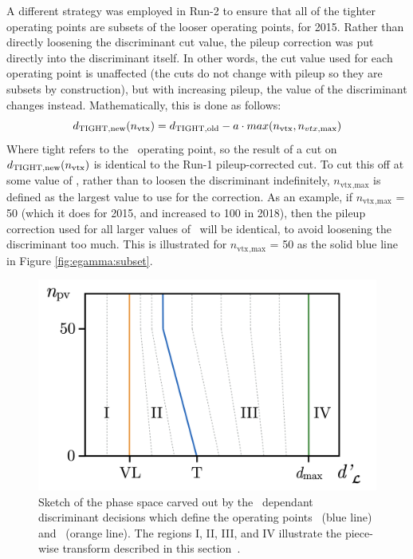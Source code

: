 A different strategy was employed in Run-2 to ensure that all of the tighter operating points are subsets of the looser operating points, for 2015.
Rather than directly loosening the discriminant cut value, the pileup correction was put directly into the discriminant itself.
In other words, the cut value used for each operating point is unaffected (the cuts do not change with pileup so they are subsets by construction), but with increasing pileup, the value of the discriminant changes instead. 
Mathematically, this is done as follows:
\begin{equation}
    d_{\mathrm{{\scriptsize T}\tiny{IGHT},new}}(n_{\mathrm{vtx}}) = d_{\mathrm{{\scriptsize T}\tiny{IGHT},old}} - a \cdot max(n_{\mathrm{vtx}}, n_{vtx,\text{max}})
\end{equation}
Where tight refers to the \Tight\ operating point, so the result of a cut on $d_{\mathrm{{\scriptsize T}IGHT,new}}(n_{\mathrm{vtx}})$ is identical to the Run-1 pileup-corrected cut.
To cut this off at some value of \nvtx, rather than to loosen the discriminant indefinitely, $n_{\mathrm{vtx}} {}_{,\text{max}}$ is defined as the largest value to use for the correction.
As an example, if $n_{\mathrm{vtx}} {}_{,\text{max}}$ = 50 (which it does for 2015, and increased to 100 in 2018), then the pileup correction used for all larger values of \nvtx\ will be identical, to avoid loosening the discriminant too much.
This is illustrated for $n_{\mathrm{vtx}} {}_{,\text{max}}$ = 50 as the solid blue line in Figure \ref{fig:egamma:subset}.
\begin{figure}[h]
\centering
\includegraphics[width=.80\textwidth]{figs/egamma/pileupCorrection.png}
\caption[The regions I, II, III, and IV illustrate the piece-wise transform described in Section~\ref{sec:egamma:pileup}]{Sketch of the phase space carved out by the \nvtx\ dependant discriminant decisions which define the operating points \Tight\ (blue line) and \VeryLoose\ (orange line).
The regions I, II, III, and IV illustrate the piece-wise transform described in this section~\cite{Brendlinger:2228644}.}
\label{fig:egamma:piecewise}
\end{figure}
